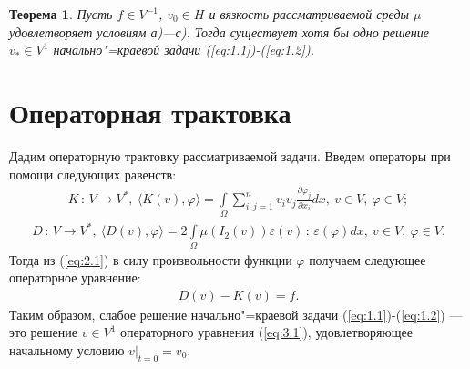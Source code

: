 \documentclass[14pt, a4paper]{extarticle}
\newtheorem{theorem}{Теорема}[section]
\numberwithin{equation}{section}
\begin{document}
    \begin{theorem}\label{th:2.1}
        Пусть $f \in V^{-1}$, $v_0 \in H$ и вязкость рассматриваемой среды 
        $\mu$ удовлетворяет условиям а)---с). Тогда существует хотя бы одно решение
        $v_* \in V^1$ начально"=краевой задачи (\ref{eq:1.1})-(\ref{eq:1.2}).
    \end{theorem}


    \section{Операторная трактовка}

    Дадим операторную трактовку рассматриваемой задачи. Введем операторы при помощи следующих равенств:
    \begin{equation*}
        \begin{gathered}
            K\, : \,V \rightarrow V^*, \ \langle K(v), \varphi \rangle =
            \int\limits_\Omega \sum\limits_{i,j=1}^n v_i v_j \frac{\partial\varphi_j}{\partial x_i}dx, \
            v \in V, \ \varphi \in V;
        \end{gathered}
    \end{equation*}
    \begin{equation*}
        \begin{gathered}
            D\, : \,V \rightarrow V^*, \ \langle D(v), \varphi \rangle =
            2\int\limits_\Omega \mu(I_2(v))\varepsilon(v)\, : \,\varepsilon(\varphi)dx, \
            v \in V, \ \varphi \in V.
        \end{gathered}
    \end{equation*}
    Тогда из (\ref{eq:2.1}) в силу произвольности функции $\varphi$ получаем следующее операторное уравнение:
    \begin{equation}\label{eq:3.1}
        \begin{gathered}
            D(v) - K(v) = f.
        \end{gathered}
    \end{equation}
    Таким образом, слабое решение начально"=краевой задачи (\ref{eq:1.1})-(\ref{eq:1.2}) --- это решение $v \in V^1$
    операторного уравнения (\ref{eq:3.1}), удовлетворяющее начальному условию $v|_{t=0} = v_0$.
\end{document}
